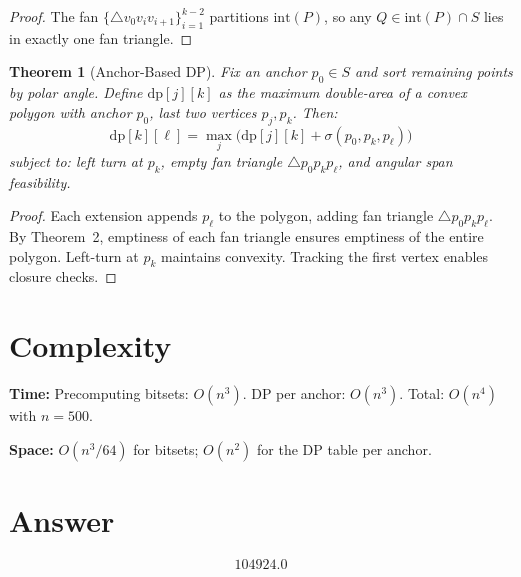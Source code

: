 \documentclass[12pt]{article}
\newtheorem{theorem}{Theorem}
\begin{document}
\begin{proof}
The fan $\{\triangle v_0 v_i v_{i+1}\}_{i=1}^{k-2}$ partitions $\mathrm{int}(P)$, so any $Q \in \mathrm{int}(P) \cap S$ lies in exactly one fan triangle.
\end{proof}

\begin{theorem}[Anchor-Based DP]
Fix an anchor $p_0 \in S$ and sort remaining points by polar angle. Define $\mathrm{dp}[j][k]$ as the maximum double-area of a convex polygon with anchor $p_0$, last two vertices $p_j, p_k$. Then:
\[
\mathrm{dp}[k][\ell] = \max_{j} \bigl(\mathrm{dp}[j][k] + \sigma(p_0, p_k, p_\ell)\bigr)
\]
subject to: left turn at $p_k$, empty fan triangle $\triangle p_0 p_k p_\ell$, and angular span feasibility.
\end{theorem}

\begin{proof}
Each extension appends $p_\ell$ to the polygon, adding fan triangle $\triangle p_0 p_k p_\ell$. By Theorem~2, emptiness of each fan triangle ensures emptiness of the entire polygon. Left-turn at $p_k$ maintains convexity. Tracking the first vertex enables closure checks.
\end{proof}

\section{Complexity}

\textbf{Time:} Precomputing bitsets: $O(n^3)$. DP per anchor: $O(n^3)$. Total: $O(n^4)$ with $n = 500$.

\textbf{Space:} $O(n^3/64)$ for bitsets; $O(n^2)$ for the DP table per anchor.

\section{Answer}

\[
\boxed{104924.0}
\]
\end{document}
